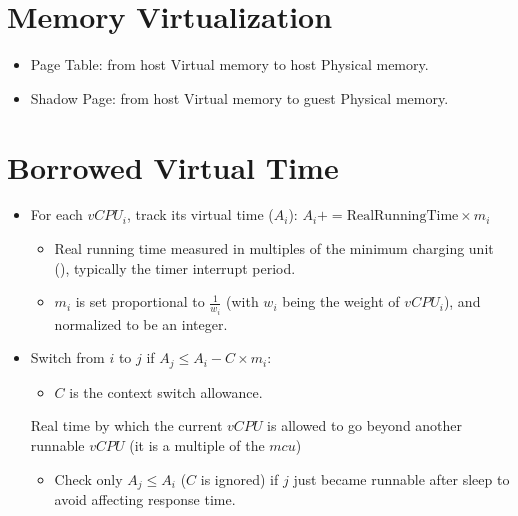 \section{Memory Virtualization}
\begin{itemize}
    \item Page Table: from host Virtual memory to host Physical memory.
    \item Shadow Page: from host Virtual memory to guest Physical memory.
\end{itemize}


\section{Borrowed Virtual Time}
\begin{itemize}
\item For each \(vCPU_i\), track its virtual time (\(A_i\)):
\(A_i += \text{RealRunningTime} \times m_i\)
\begin{itemize}
  \item Real running time measured in multiples of the minimum charging unit (), typically the timer interrupt period.
  \item \(m_i\) is set proportional to \(\frac{1}{w_i}\) (with \(w_i\) being the weight of \(vCPU_i\)), and normalized to be an integer.
\end{itemize}

\item Switch from \(i\) to \(j\) if \(A_j \leq A_i - C \times m_i\):
\begin{itemize}
  \item \(C\) is the context switch allowance.
\end{itemize}

Real time by which the current \(vCPU\) is allowed to go beyond another runnable \(vCPU\) (it is a multiple of the \(mcu\))
\begin{itemize}
  \item Check only \(A_j \leq A_i\) (\(C\) is ignored) if \(j\) just became runnable after sleep to avoid affecting response time.
\end{itemize}
\end{itemize}


